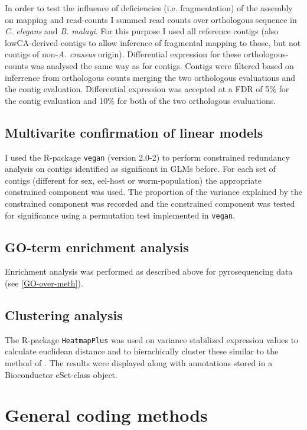In order to test the influence of deficiencies (i.e. fragmentation) of
the assembly on mapping and read-counts I summed read counts over
orthologous sequence in \textit{C. elegans} and
\textit{B. malayi}. For this purpose I used all reference contigs
(also lowCA-derived contigs to allow inference of fragmental mapping
to those, but not contigs of non-\textit{A. crassus} origin).
Differential expression for these orthologous-counts was analysed the
same way as for contigs. Contigs were filtered based on inferrence
from orthologous counts merging the two orthologous evaluations and
the contig evaluation. Differential expression was accepted at a FDR
of 5\% for the contig evaluation and 10\% for both of the two
orthologous evaluations.

\subsection{Multivarite confirmation of linear models}
\label{sec:mult-conf-line}

I used the R-package \texttt{vegan} (version 2.0-2) to perform
constrained redundancy analysis on contigs identified as significant
in GLMs before. For each set of contigs (different for sex, eel-host
or worm-population) the appropriate constrained component was
used. The proportion of the variance explained by the constrained
component was recorded and the constrained component was tested for
significance using a permutation test implemented in \texttt{vegan}.

\subsection{GO-term enrichment analysis}

Enrichment analysis was performed as described above for
pyrosequencing data (see \ref{GO-over-meth}).

\subsection{Clustering analysis}

The R-package \texttt{HeatmapPlus} was used on variance stabilized
expression values to calculate euclidean distance and to hierachically
cluster these similar to the method of \cite{pmid9843981}. The results
were displayed along with annotations stored in a Bioconductor
eSet-class object.

\section{General coding methods}


